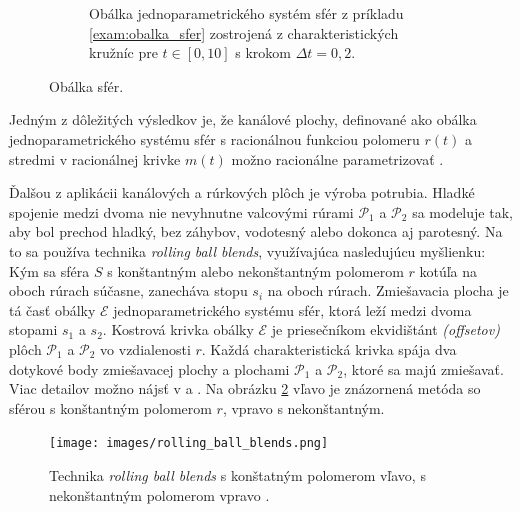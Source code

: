\begin{example}
\begin{figure}[h]
\begin{subfigure}[t]{0.45\textwidth}
	\caption[Obálka jednoparametrického systém sfér.]{Obálka jednoparametrického systém sfér z príkladu \ref{exam:obalka_sfer} zostrojená z charakteristických kružníc pre $t \in [0,10]$ s krokom $\Delta t = 0,2.$ }
    \end{subfigure}
    \caption{Obálka sfér.}
    \label{fig:envelope_spheres}
\end{figure}

%
\end{example}

Jedným z dôležitých výsledkov je, že kanálové plochy, definované ako obálka jednoparametrického systému sfér s racionálnou funkciou polomeru $r(t)$ a stredmi v racionálnej krivke $m(t)$ možno racionálne parametrizovať \cite{Pet97}.


Ďalšou z aplikácii kanálových a rúrkových plôch je výroba potrubia. Hladké spojenie medzi dvoma nie nevyhnutne valcovými rúrami $\mathcal{P}_1$ a $\mathcal{P}_2$ sa modeluje tak, aby bol prechod hladký, bez záhybov, vodotesný alebo dokonca aj parotesný. Na to sa používa technika \textit{rolling ball blends}, využívajúca nasledujúcu myšlienku: Kým sa sféra $S$ s konštantným alebo nekonštantným polomerom $r$ kotúľa na oboch rúrach súčasne, zanecháva stopu $s_i$ na oboch rúrach. Zmiešavacia plocha je tá časť obálky $\mathcal{E}$ jednoparametrického systému sfér, ktorá leží medzi dvoma stopami $s_1$ a $s_2$. Kostrová krivka obálky $\mathcal{E}$ je priesečníkom ekvidištánt \textit{(offsetov)} plôch $\mathcal{P}_1$ a $\mathcal{P}_2$ vo vzdialenosti $r$. Každá charakteristická krivka spája dva dotykové body zmiešavacej plochy a plochami $\mathcal{P}_1$ a $\mathcal{P}_2$, ktoré sa majú zmiešavať. Viac detailov možno nájsť v \cite{Kar00} a \cite{Ode20}. Na obrázku \ref{fig:rolling_ball_blends} vľavo je znázornená metóda so sférou s konštantným polomerom $r$, vpravo s nekonštantným.

\begin{figure}[h]
	\centering
	\texttt{[image: images/rolling\_ball\_blends.png]}
	\caption[Technika rolling ball blends.]{Technika \textit{rolling ball blends} s konštatným polomerom vľavo, s nekonštantným polomerom vpravo \cite{Rollingballblends}.}
	\label{fig:rolling_ball_blends}
\end{figure}